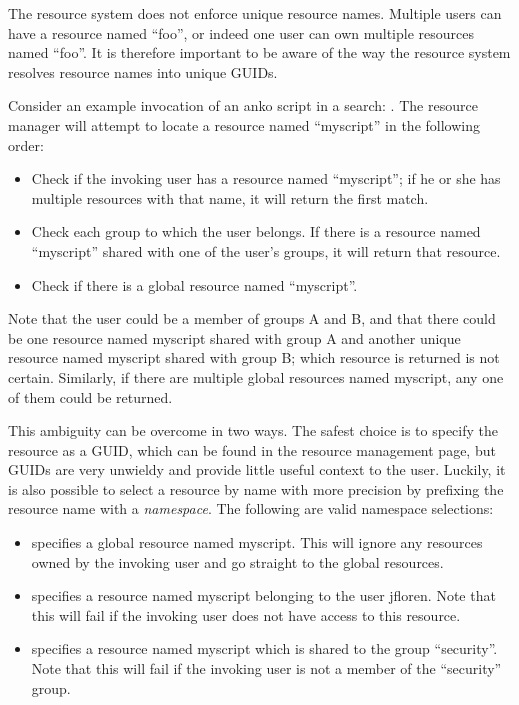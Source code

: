The resource system does not enforce unique resource names. Multiple
users can have a resource named ``foo'', or indeed one user can own
multiple resources named ``foo''. It is therefore important to be aware of
the way the resource system resolves resource names into unique GUIDs.

Consider an example invocation of an anko script in a search: . The resource manager will attempt to locate a resource named
``myscript'' in the following order:

\begin{itemize}
\item
  Check if the invoking user has a resource named ``myscript''; if he
  or she has multiple resources with that name, it will return the first
  match.
\item
  Check each group to which the user belongs. If there is a resource
  named ``myscript'' shared with one of the user's groups, it will
  return that resource.
\item
  Check if there is a global resource named ``myscript''.
\end{itemize}

Note that the user could be a member of groups A and B, and that there
could be one resource named myscript shared with group A and another
unique resource named myscript shared with group B; which resource
is returned is not certain. Similarly, if there are multiple global
resources named myscript, any one of them could be returned.

This ambiguity can be overcome in two ways. The safest choice is to
specify the resource as a GUID, which can be found in the resource
management page, but GUIDs are very unwieldy and provide little useful
context to the user. Luckily, it is also possible to select a resource
by name with more precision by prefixing the resource name with a
\emph{namespace}. The following are valid namespace selections:

\begin{itemize}
\item
   specifies a global resource named myscript.
  This will ignore any resources owned by the invoking user and go
  straight to the global resources.
\item
   specifies a resource named
  myscript belonging to the user jfloren. Note that this will
  fail if the invoking user does not have access to this resource.
\item
   specifies a resource named
  myscript which is shared to the group ``security''. Note that this
  will fail if the invoking user is not a member of the
  ``security'' group.
\end{itemize}

